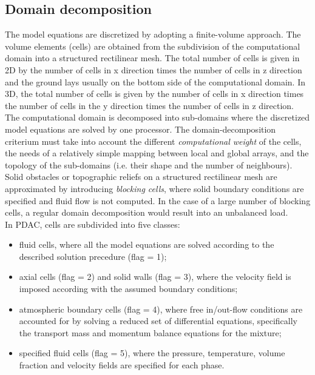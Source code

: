\subsection{Domain decomposition}
The model equations are discretized by adopting a finite-volume approach. The
volume elements (cells) are obtained from the subdivision of the computational
domain into a structured rectilinear mesh. The total number
of cells is given in 2D by the number of cells in x direction times the number 
of cells in z direction and the ground lays usually on the bottom side of the
computational domain.
In 3D, the total number of cells is given by the number of cells in x direction
times the number of cells in the y direction times the number of cells in z 
direction.
The computational domain is decomposed into sub-domains where the discretized
model equations are solved by one processor.
The domain-decomposition criterium must take into account the different
{\it computational weight} of the cells, the needs of a relatively simple
mapping between local and global arrays, and the topology of the sub-domains
(i.e. their shape and the number of neighbours). 
Solid obstacles or topographic reliefs on a structured rectilinear mesh are 
approximated by introducing {\em blocking cells}, where solid boundary 
conditions are specified and fluid flow is not computed.
In the case of a large number of blocking cells, 
a regular domain decomposition would result into an unbalanced load.\\
In PDAC, cells are subdivided into five classes:
\begin{itemize}
\item fluid cells, where all the model equations are solved according to the described solution precedure (flag = 1);
\item axial cells (flag = 2) and solid walls (flag = 3), where the velocity 
field is imposed according with the assumed boundary conditions; 
\item atmospheric boundary cells (flag = 4), where free in/out-flow 
conditions are accounted for by solving a reduced set of differential 
equations, specifically the transport mass and momentum balance equations 
for the mixture;
\item specified fluid cells (flag = 5), where the pressure, temperature, 
volume fraction and velocity fields are specified for each phase.
\end{itemize}

